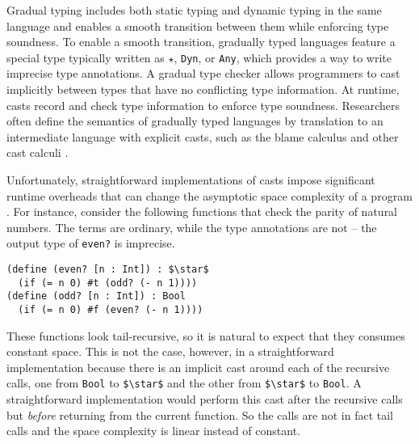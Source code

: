 \documentclass[runningheads]{llncs}
\newcommand{\Tdyn}[0]{\ensuremath{\star}}
\begin{document}
Gradual typing \citep{siek2006gradual,siek2015refined} includes both static typing 
and dynamic typing in the same language and enables a smooth transition between them while
enforcing type soundness.
To enable a smooth transition, gradually typed languages feature a special type
typically written as \Tdyn{}, \lstinline|Dyn|, or \lstinline|Any|, which
provides a way to write imprecise type annotations. A gradual type checker allows programmers to cast 
implicitly between types that have no conflicting type information.
At runtime, casts record and check type information to enforce type soundness.
Researchers often define the semantics of gradually typed languages by
translation to an intermediate language with explicit casts, such as the blame
calculus \citep{wadler2009well} and other cast calculi \citep{siek2009exploring}.

Unfortunately, straightforward implementations of casts impose significant 
runtime overheads that can change the asymptotic space complexity of a program 
\citep{herman2010space}.
For instance, consider the following functions 
that check the parity of natural numbers. The terms are ordinary, while the 
type annotations are not -- the output type of \lstinline|even?| is 
imprecise.
\begin{lstlisting}
(define (even? [n : Int]) : $\star$
  (if (= n 0) #t (odd? (- n 1))))
(define (odd? [n : Int]) : Bool
  (if (= n 0) #f (even? (- n 1))))
\end{lstlisting}
These functions look tail-recursive, so it is natural to expect that
they consumes constant space. This is not the case, however, in a
straightforward implementation because there is an implicit cast
around each of the recursive calls, one from \lstinline|Bool| to
\lstinline|$\star$| and the other from \lstinline|$\star$| to
\lstinline|Bool|.  A straightforward implementation would perform this
cast after the recursive calls but \textit{before} returning from the
current function. So the calls are not in fact tail calls and the
space complexity is linear instead of constant.
\end{document}

